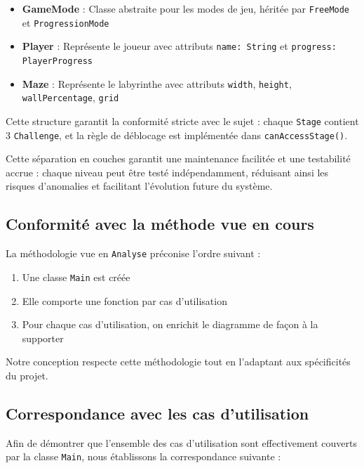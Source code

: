 \documentclass{butexFR}
\begin{document}
\begin{itemize}
    \item \textbf{GameMode} : Classe abstraite pour les modes de jeu, héritée par \texttt{FreeMode} et \texttt{ProgressionMode}

    \item \textbf{Player} : Représente le joueur avec attributs \texttt{name: String} et \texttt{progress: PlayerProgress}

    \item \textbf{Maze} : Représente le labyrinthe avec attributs \texttt{width}, \texttt{height}, \texttt{wallPercentage}, \texttt{grid}
\end{itemize}

Cette structure garantit la conformité stricte avec le sujet : chaque \texttt{Stage} contient 3 \texttt{Challenge}, et la règle de déblocage est implémentée dans \texttt{canAccessStage()}.

Cette séparation en couches garantit une maintenance facilitée et une testabilité accrue : chaque niveau peut être testé indépendamment, réduisant ainsi les risques d'anomalies et facilitant l'évolution future du système.

\subsection{Conformité avec la méthode vue en cours}

La méthodologie vue en \texttt{Analyse} préconise l'ordre suivant :

\begin{enumerate}
\item Une classe \texttt{Main} est créée
\item Elle comporte une fonction par cas d'utilisation
\item Pour chaque cas d'utilisation, on enrichit le diagramme de façon à la supporter
\end{enumerate}

Notre conception respecte cette méthodologie tout en l'adaptant aux spécificités du projet.

\subsection{Correspondance avec les cas d'utilisation}

Afin de démontrer que l'ensemble des cas d'utilisation sont effectivement couverts par la classe \texttt{Main}, nous établissons la correspondance suivante :
\end{document}
